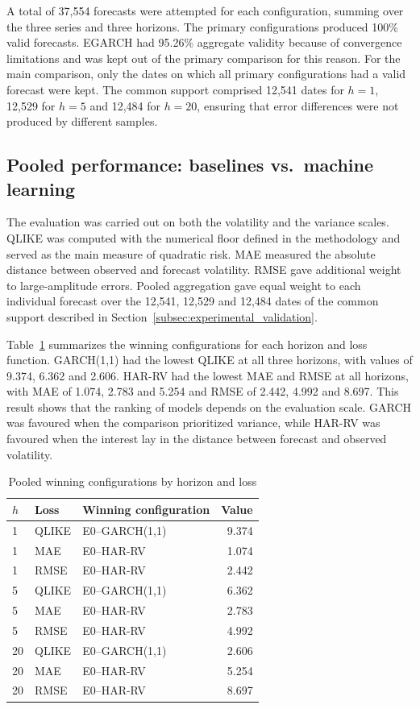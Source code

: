 \documentclass[a4paper,fleqn]{cas-sc}
\begin{document}
A total of 37,554 forecasts were attempted for each configuration, summing over the three series and three horizons. The primary configurations produced 100\% valid forecasts. EGARCH had 95.26\% aggregate validity because of convergence limitations and was kept out of the primary comparison for this reason. For the main comparison, only the dates on which all primary configurations had a valid forecast were kept. The common support comprised 12,541 dates for \(h=1\), 12,529 for \(h=5\) and 12,484 for \(h=20\), ensuring that error differences were not produced by different samples.

\subsection{Pooled performance: baselines vs.\ machine learning}
\label{subsec:results_coverage}

The evaluation was carried out on both the volatility and the variance scales. QLIKE was computed with the numerical floor defined in the methodology and served as the main measure of quadratic risk. MAE measured the absolute distance between observed and forecast volatility. RMSE gave additional weight to large-amplitude errors. Pooled aggregation gave equal weight to each individual forecast over the 12,541, 12,529 and 12,484 dates of the common support described in Section~\ref{subsec:experimental_validation}.

Table~\ref{tab:pooled_results} summarizes the winning configurations for each horizon and loss function. GARCH(1,1) had the lowest QLIKE at all three horizons, with values of 9.374, 6.362 and 2.606. HAR-RV had the lowest MAE and RMSE at all horizons, with MAE of 1.074, 2.783 and 5.254 and RMSE of 2.442, 4.992 and 8.697. This result shows that the ranking of models depends on the evaluation scale. GARCH was favoured when the comparison prioritized variance, while HAR-RV was favoured when the interest lay in the distance between forecast and observed volatility.

\begin{table}[t]
\centering
\caption{Pooled winning configurations by horizon and loss}
\label{tab:pooled_results}
\scriptsize
\setlength{\tabcolsep}{2pt}
\begin{tabular}{@{}p{0.65cm}p{1.05cm}p{2.55cm}r@{}}
\hline
\(h\) & Loss & Winning configuration & Value \\
\hline
1 & QLIKE & E0--GARCH(1,1) & 9.374 \\
1 & MAE & E0--HAR-RV & 1.074 \\
1 & RMSE & E0--HAR-RV & 2.442 \\
5 & QLIKE & E0--GARCH(1,1) & 6.362 \\
5 & MAE & E0--HAR-RV & 2.783 \\
5 & RMSE & E0--HAR-RV & 4.992 \\
20 & QLIKE & E0--GARCH(1,1) & 2.606 \\
20 & MAE & E0--HAR-RV & 5.254 \\
20 & RMSE & E0--HAR-RV & 8.697 \\
\hline
\end{tabular}
\end{table}
\end{document}
